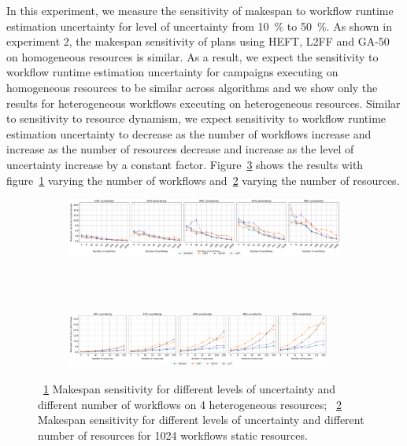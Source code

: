 In this experiment, we measure the sensitivity of makespan to workflow runtime estimation uncertainty for level of uncertainty from 10~\% to 50~\%.
As shown in experiment 2, the makespan sensitivity of plans using HEFT, L2FF and GA-50 on homogeneous resources is similar.
As a result, we expect the sensitivity to workflow runtime estimation uncertainty for campaigns executing on homogeneous resources to be similar across algorithms and we show only the results for heterogeneous workflows executing on heterogeneous resources.
Similar to sensitivity to resource dynamism, we expect sensitivity to workflow runtime estimation uncertainty to decrease as the number of workflows increase and increase as the number of resources decrease and increase as the level of uncertainty increase by a constant factor.
Figure~\ref{fig:inaccur_st} shows the results with figure~\ref{fig:InaccurStHeteroCampaigns_4StHeteroResourcesSens} varying the number of workflows and~\ref{fig:InaccurStHeteroResources_StHeteroCampaignsSens} varying the number of resources.

\begin{figure}[ht!]
    \centering
    \begin{subfigure}[b]{0.85\textwidth}
        \includegraphics[width=.95\textwidth]{figures/campaign/InaccurStHeteroCampaigns_4StHeteroResourcesSens.pdf}
        \caption{}
        \label{fig:InaccurStHeteroCampaigns_4StHeteroResourcesSens}
    \end{subfigure}\\
    ~ 
    \begin{subfigure}[b]{0.85\textwidth}
        \includegraphics[width=0.95\textwidth]{figures/campaign/InaccurStHeteroResources_StHeteroCampaignsSens.pdf}
        \caption{}
        \label{fig:InaccurStHeteroResources_StHeteroCampaignsSens}
    \end{subfigure}
    \caption{~\ref{fig:InaccurStHeteroCampaigns_4StHeteroResourcesSens} Makespan sensitivity for different levels of uncertainty and different number of workflows on 4 heterogeneous resources;
    ~\ref{fig:InaccurStHeteroResources_StHeteroCampaignsSens} Makespan sensitivity for different levels of uncertainty and different number of resources for 1024 workflows static resources.}
    \label{fig:inaccur_st}
\end{figure}

